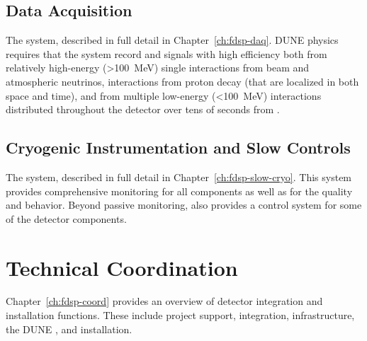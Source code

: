 \subsection{Data Acquisition}
\label{sec:fdsp-ov-daq}

The  system, described in full detail in Chapter~\ref{ch:fdsp-daq}.
DUNE physics requires that the  system record  and  signals with high efficiency both from relatively high-energy (>\SI{100}{MeV}) single interactions from beam and atmospheric neutrinos, interactions from proton decay (that are localized in both space and time), and from multiple low-energy (<\SI{100}{MeV}) interactions distributed throughout the detector over tens of seconds from .
\subsection{Cryogenic Instrumentation and Slow Controls}
\label{sec:fdsp-ov-instr}

The  system, described in full detail in Chapter~\ref{ch:fdsp-slow-cryo}.
This system provides comprehensive monitoring for all  components as well as for the \lar quality and behavior.  Beyond passive monitoring,  also provides a control system for some of the detector components.

\section{Technical Coordination}
\label{sec:fdsp-ov-tc}
Chapter~\ref{ch:fdsp-coord} provides an overview of detector integration and installation functions. These include project support, integration, infrastructure, the DUNE , and installation.

